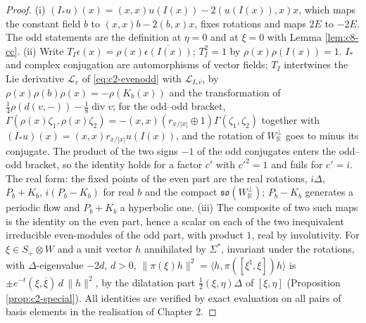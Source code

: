 \begin{proof}
(i) $(I_*u)(x)=(x,x)u(I(x))-2(u(I(x)),x)x$, which maps the constant field $b$ to $(x,x)b-2(b,x)x$, fixes rotations and maps $2E$ to $-2E$. The odd statements are the definition at $\eta=0$ and at $\xi=0$ with Lemma \ref{lem:c8-cc}. (ii) Write $T_I\epsilon(x)=\rho(x)\overline{\epsilon(I(x))}$; $T_I^2=1$ by $\rho(x)\rho(I(x))=1$. $I_*$ and complex conjugation are automorphisms of vector fields; $T_I$ intertwines the Lie derivative $\mathcal L_v$ of \eqref{eq:c2-evenodd} with $\mathcal L_{I_*\bar v}$, by $\rho(x)\rho(b)\rho(x)=-\rho(K_b(x))$ and the transformation of $\tfrac14\rho(d(v,-))-\tfrac18\operatorname{div}v$; for the odd--odd bracket, $\Gamma(\rho(x)\zeta_1,\rho(x)\zeta_2)=-(x,x)(r_{x/|x|}\oplus1)\Gamma(\zeta_1,\zeta_2)$ together with $(I_*u)(x)=(x,x)r_{x/|x|}u(I(x))$, and the rotation of $W_{\mathbb R}^\perp$ goes to minus its conjugate. The product of the two signs $-1$ of the odd conjugates enters the odd--odd bracket, so the identity holds for a factor $c'$ with $c'^2=1$ and fails for $c'=i$. The real form: the fixed points of the even part are the real rotations, $i\Delta$, $P_b+K_b$, $i(P_b-K_b)$ for real $b$ and the compact $\mathfrak{so}(W_{\mathbb R}^\perp)$; $P_b-K_b$ generates a periodic flow and $P_b+K_b$ a hyperbolic one. (iii) The composite of two such maps is the identity on the even part, hence a scalar on each of the two inequivalent irreducible even-modules of the odd part, with product $1$, real by involutivity. For $\xi\in S_+\otimes W$ and a unit vector $h$ annihilated by $\Sigma^*$, invariant under the rotations, with $\Delta$-eigenvalue $-2d$, $d>0$, $\|\pi(\xi)h\|^2=\langle h,\pi([\xi^\natural,\xi])h\rangle$ is $\pm e^{-t}(\xi,\overline\xi)\,d\,\|h\|^2$, by the dilatation part $\tfrac12(\xi,\eta)\Delta$ of $[\xi,\eta]$ (Proposition \ref{prop:c2-special}). All identities are verified by exact evaluation on all pairs of basis elements in the realisation of Chapter 2.
\end{proof}

